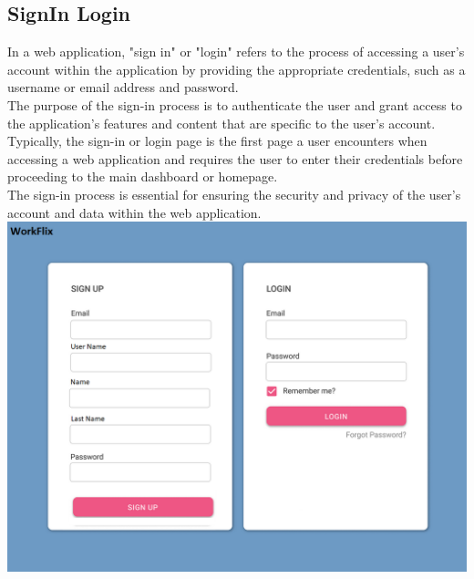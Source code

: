 \subsection{SignIn Login}

In a web application, "sign in" or "login" refers to the process of accessing a user's account within the application by providing the appropriate credentials, such as a username or email address and password.\\

The purpose of the sign-in process is to authenticate the user and grant access to the application's features and content that are specific to the user's account.\\

Typically, the sign-in or login page is the first page a user encounters when accessing a web application and requires the user to enter their credentials before proceeding to the main dashboard or homepage.\\

The sign-in process is essential for ensuring the security and privacy of the user's account and data within the web application.\\
\includegraphics[width=\columnwidth]{images/SignInLogIn.jpg}

